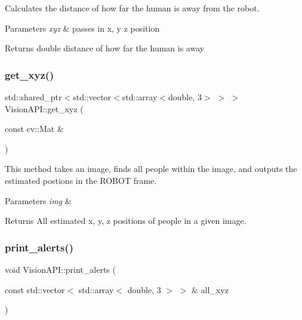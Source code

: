 Calculates the distance of how far the human is away from the robot. 


\begin{DoxyParams}{Parameters}
{\em xyz} & passes in x, y z position \\
\hline
\end{DoxyParams}
\begin{DoxyReturn}{Returns}
double distance of how far the human is away 
\end{DoxyReturn}
\mbox{\label{class_vision_a_p_i_ab7a4230270a858147e81ced0707f6056}} 
\subsubsection{\texorpdfstring{get\+\_\+xyz()}{get\_xyz()}}
{\footnotesize\ttfamily std\+::shared\+\_\+ptr$<$std\+::vector$<$std\+::array$<$double, 3$>$ $>$ $>$ Vision\+A\+P\+I\+::get\+\_\+xyz (\begin{DoxyParamCaption}\item[{const cv\+::\+Mat \&}]{ }\end{DoxyParamCaption})}



This method takes an image, finds all people within the image, and outputs the estimated postions in the R\+O\+B\+OT frame. 


\begin{DoxyParams}{Parameters}
{\em img} & \\
\hline
\end{DoxyParams}
\begin{DoxyReturn}{Returns}
All estimated x, y, z positions of people in a given image. 
\end{DoxyReturn}
\mbox{\label{class_vision_a_p_i_a67fb3aea734b0517548102bf757cc6ed}} 
\subsubsection{\texorpdfstring{print\+\_\+alerts()}{print\_alerts()}}
{\footnotesize\ttfamily void Vision\+A\+P\+I\+::print\+\_\+alerts (\begin{DoxyParamCaption}\item[{const std\+::vector$<$ std\+::array$<$ double, 3 $>$ $>$ \&}]{all\+\_\+xyz }\end{DoxyParamCaption})}



